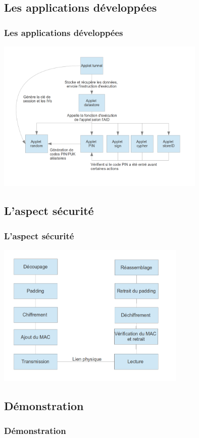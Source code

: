 \documentclass{beamer}
\begin{document}
\subsection{Les applications développées}
\begin{frame}
    \frametitle{Les applications développées}
 \includegraphics[width=10cm]{graphe_dep}
    \begin{block}{}
    \end{block}
\end{frame}

\subsection{L'aspect sécurité}
\begin{frame}
    \frametitle{L'aspect sécurité}
    \includegraphics[width=9cm]{stack}
\end{frame}

\subsection{Démonstration}
\begin{frame}
    \frametitle{Démonstration}
    \begin{block}{}
    \end{block}
\end{frame}
\end{document}
